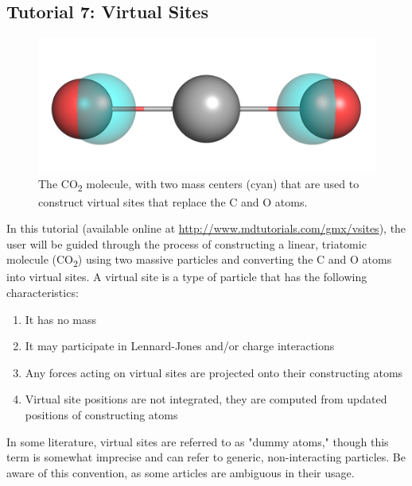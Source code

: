 \documentclass[9pt,tutorial]{livecoms}
\newcommand{\urlstring}{http://www.mdtutorials.com/gmx}
\newcommand{\tutorialvsite}{\url{\urlstring/vsites}}
\begin{document}
\subsection{Tutorial 7: Virtual Sites} \label{vsite}

\begin{figure}[H]
\centering
\includegraphics{vsites_co2}
\caption{The CO\textsubscript{2} molecule, with two mass centers (cyan) that are used to construct virtual sites that replace the C and O atoms.}
\label{vsites_co2_fig}
\end{figure}

In this tutorial (available online at \tutorialvsite), the user will be guided through the process of constructing a linear, triatomic molecule (CO\textsubscript{2}) using two massive particles and converting the C and O atoms into virtual sites. A virtual site is a type of particle that has the following characteristics:

\begin{enumerate}
	\item It has no mass
	\item It may participate in Lennard-Jones and/or charge interactions
	\item Any forces acting on virtual sites are projected onto their constructing atoms
	\item Virtual site positions are not integrated, they are computed from updated positions of constructing atoms
\end{enumerate}

In some literature, virtual sites are referred to as "dummy atoms," though this term is somewhat imprecise and can refer to generic, non-interacting particles. Be aware of this convention, as some articles are ambiguous in their usage.
\end{document}
